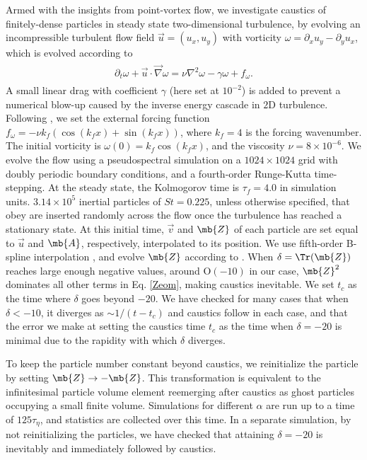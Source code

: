 Armed with the insights from point-vortex flow, we investigate caustics of finitely-dense particles in steady state two-dimensional turbulence, by evolving an incompressible turbulent flow field $\vec{u} = (u_x,u_y)$ with vorticity $\omega=\partial_x u_y - \partial_y u_x$, which is evolved according to
\begin{align}
  \label{2DNS}
  \begin{split}
      \partial_t\omega + \vec{u}\cdot\vec{\nabla} \omega = \nu\nabla^2\omega - \gamma \omega  +  f_\omega.
  \end{split}
\end{align}
A small linear drag with coefficient $\gamma$ (here set at $10^{-2}$) is added to prevent a numerical blow-up caused by the inverse energy cascade in $2$D turbulence. Following \cite{pandey2019}, we set the external forcing function $f_\omega = -\nu k_f(\cos(k_f x) + \sin(k_f x))$, where $k_f = 4$ is the forcing wavenumber. The initial vorticity is $\omega(0) = k_f\cos(k_f x)$, and the viscosity $\nu = 8 \times 10^{-6}$. We evolve the flow using a pseudospectral simulation on a $1024\times 1024$ grid with doubly periodic boundary conditions, and a fourth-order Runge-Kutta time-stepping. At the steady state, the Kolmogorov time is $\tau_f = 4.0$ in simulation units. $3.14 \times 10^{5}$ inertial particles of $St=0.225$, unless otherwise specified, that obey  are inserted randomly across the flow once the turbulence has reached a stationary state. At this initial time, $\vec v$ and $\mb{Z}$ of each particle are set equal to $\vec u$ and $\mb{A}$, respectively, interpolated to its position. We use fifth-order B-spline interpolation \cite{vanhinsberg2012}, and evolve $\mb{Z}$ according to . {When $\delta = \Tr(\mb{Z})$ reaches large enough negative values, around $\text{O}(-10)$ in our case, $\mb{Z}^2$ dominates all other terms in Eq. \eqref{Zeom}, making caustics inevitable. We set $t_c$ as the time where $\delta$ goes beyond $-20$. We have checked for many cases that when $\delta<-10$, it diverges as $\sim 1/(t-t_c)$ and caustics follow in each case, and that the error we make at setting the caustics time $t_c$ as the time when $\delta = -20$ is minimal due to the rapidity with which $\delta$ diverges. }

To keep the particle number constant beyond caustics, we reinitialize the particle by setting $\mb{Z} \to -\mb{Z}$. This transformation is equivalent to the infinitesimal particle volume element reemerging after caustics as ghost particles \cite{falkovich2007} occupying a small finite volume. Simulations for different $\alpha$ are run up to a time of $125\tau_\eta$, and statistics are collected over this time. {In a separate simulation, by not reinitializing the particles, we have checked that attaining $\delta = -20$ is inevitably and immediately followed by caustics. }


